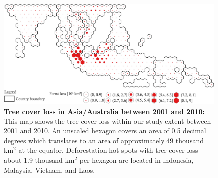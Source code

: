 			\begin{figure}[ht]
				\centering
				\includegraphics[scale=.9]{img/asia_loss_frameless}
				\caption[Tree cover loss in Asia/Australia between 2001 and 2010]{\textbf{Tree cover loss in Asia/Australia between 2001 and 2010:} This map shows the tree cover loss within our study extent between 2001 and 2010. An unscaled hexagon covers an area of 0.5 decimal degrees which translates to an area of approximately 49 thousand km$^2$ at the equator. Deforestation hot-spots with tree cover loss about 1.9 thousand km$^2$ per hexagon are located in Indonesia, Malaysia, Vietnam, and Laos.}
				\label{fig:asia_loss}
			\end{figure}

